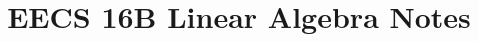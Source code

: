 \documentclass{../content16b}
\begin{document}
\title{EECS 16B Linear Algebra Notes}
\renewcommand{\printchaptername}{\chapnamefont Lecture}

\tableofcontents







\end{document}
